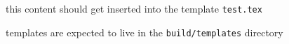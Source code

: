 \documentclass[12pt]{article}
\begin{document}
this content should get inserted into the template \verb|test.tex|

templates are expected to live in the \verb|build/templates|  directory
\end{document}
